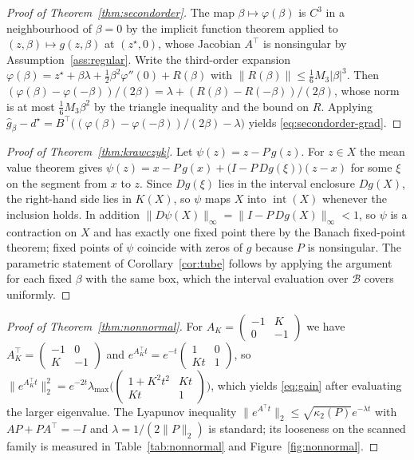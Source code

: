 \documentclass[11pt]{article}
\theoremstyle{definition}
\theoremstyle{remark}
\newcommand{\norm}[1]{\lVert #1 \rVert}
\newcommand{\abs}[1]{\lvert #1 \rvert}
\begin{document}
\begin{proof}[Proof of Theorem~\ref{thm:secondorder}]
The map $\beta \mapsto \varphi(\beta)$ is $C^3$ in a neighbourhood of $\beta = 0$ by the implicit
function theorem applied to $(z,\beta) \mapsto g(z,\beta)$ at $(z^\star,0)$, whose Jacobian
$A^{\top}$ is nonsingular by Assumption~\ref{ass:regular}. Write the third-order expansion
$\varphi(\beta) = z^\star + \beta\lambda + \tfrac12\beta^2\varphi''(0) + R(\beta)$ with
$\norm{R(\beta)} \le \tfrac16 M_3\abs{\beta}^3$. Then
$(\varphi(\beta)-\varphi(-\beta))/(2\beta) = \lambda + (R(\beta)-R(-\beta))/(2\beta)$, whose norm
is at most $\tfrac16 M_3\beta^2$ by the triangle inequality and the bound on $R$. Applying
$\widehat g_\beta - d^\star = B^{\top}\bigl((\varphi(\beta)-\varphi(-\beta))/(2\beta) - \lambda\bigr)$
yields \eqref{eq:secondorder-grad}.
\end{proof}

\begin{proof}[Proof of Theorem~\ref{thm:krawczyk}]
Let $\psi(z) = z - P\,g(z)$. For $z \in X$ the mean value theorem gives
$\psi(z) = x - P\,g(x) + \bigl(I - P\,Dg(\xi)\bigr)(z - x)$ for some $\xi$ on the segment from
$x$ to $z$. Since $Dg(\xi)$ lies in the interval enclosure $Dg(X)$, the right-hand side lies in
$K(X)$, so $\psi$ maps $X$ into $\operatorname{int}(X)$ whenever the inclusion holds. In addition
$\norm{D\psi(X)}_{\infty} = \norm{I - P\,Dg(X)}_{\infty} < 1$, so $\psi$ is a contraction on $X$
and has exactly one fixed point there by the Banach fixed-point theorem; fixed points of $\psi$
coincide with zeros of $g$ because $P$ is
nonsingular. The parametric statement of Corollary~\ref{cor:tube} follows by applying the argument
for each fixed $\beta$ with the same box, which the interval evaluation over $\mathcal{B}$ covers
uniformly.
\end{proof}

\begin{proof}[Proof of Theorem~\ref{thm:nonnormal}]
For $A_K = \begin{pmatrix} -1 & K \\ 0 & -1 \end{pmatrix}$ we have
$A_K^{\top} = \begin{pmatrix} -1 & 0 \\ K & -1 \end{pmatrix}$ and
$e^{A_K^{\top}t} = e^{-t}\begin{pmatrix} 1 & 0 \\ Kt & 1 \end{pmatrix}$, so
$\norm{e^{A_K^{\top}t}}_2^2 = e^{-2t}\lambda_{\max}\bigl(\begin{pmatrix} 1+K^2t^2 & Kt \\ Kt & 1\end{pmatrix}\bigr)$,
which yields \eqref{eq:gain} after evaluating the larger eigenvalue. The Lyapunov inequality
$\norm{e^{A^{\top}t}}_2 \le \sqrt{\kappa_2(P)}e^{-\lambda t}$ with $AP + PA^{\top} = -I$ and
$\lambda = 1/(2\norm{P}_2)$ is standard; its looseness on the scanned family is measured in
Table~\ref{tab:nonnormal} and Figure~\ref{fig:nonnormal}.
\end{proof}
\end{document}
